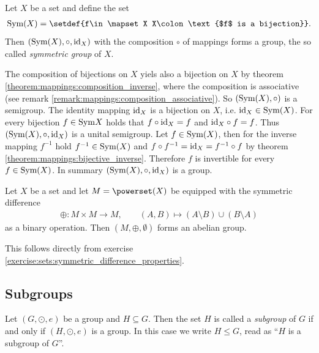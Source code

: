 \begin{examples}
    \begin{exampleenumerate}
        \item\label{example:groups:symmetric_group} Let $X$ be a set and define the set \begin{align}\symset(X)=\setdef{f\in\mapset X X\colon \text{$f$ is a bijection}}.\end{align} Then $(\text{Sym}(X),\circ,\text{id}_X)$ with the composition $\circ$ of mappings forms a group, the so called \emph{symmetric group} of $X$.
        \begin{miniproof}
            The composition of bijections on $X$ yiels also a bijection on $X$ by theorem \ref{theorem:mappings:composition_inverse}, where the composition is associative (see remark \ref{remark:mappings:composition_associative}). So $(\text{Sym}(X),\circ)$ is a semigroup. The identity mapping $\text{id}_X$ is a bijection on $X$, i.e. $\text{id}_X\in\text{Sym}(X)$. For every bijection $f\in\text{Sym} X$ holds that $f\circ\text{id}_X=f$ and $\text{id}_X\circ f=f$. Thus $(\text{Sym}(X),\circ,\text{id}_X)$ is a unital semigroup. Let $f\in\text{Sym}(X)$, then for the inverse mapping $f^{-1}$ hold $f^{-1}\in\text{Sym}(X)$ and $f\circ f^{-1}=\text{id}_X=f^{-1}\circ f$ by theorem \ref{theorem:mappings:bijective_inverse}. Therefore $f$ is invertible for every $f\in\text{Sym}(X)$. In summary $(\text{Sym}(X),\circ,\text{id}_X)$ is a group.
        \end{miniproof}

        \item Let $X$ be a set and let $M = \powerset(X)$ be equipped with the symmetric difference
        \begin{align}\oplus\colon M\times M \to M, \qquad (A,B) \mapsto (A\setminus B) \cup (B\setminus A)\end{align}
        as a binary operation. Then $(M, \oplus, \emptyset)$ forms an abelian group.
        \begin{miniproof}
            This follows directly from exercise \ref{exercise:sets:symmetric_difference_properties}.
        \end{miniproof}
    \end{exampleenumerate}
\end{examples}

\subsection{Subgroups}

\begin{definition}[Subgroups]
    Let $(G,\odot,e)$ be a group and $H\subseteq G$. Then the set $H$ is called a \emph{subgroup} of $G$ if and only if $(H,\odot,e)$ is a group. In this case we write $H\leq G$, read as \enquote{$H$ is a subgroup of $G$}.
\end{definition}

